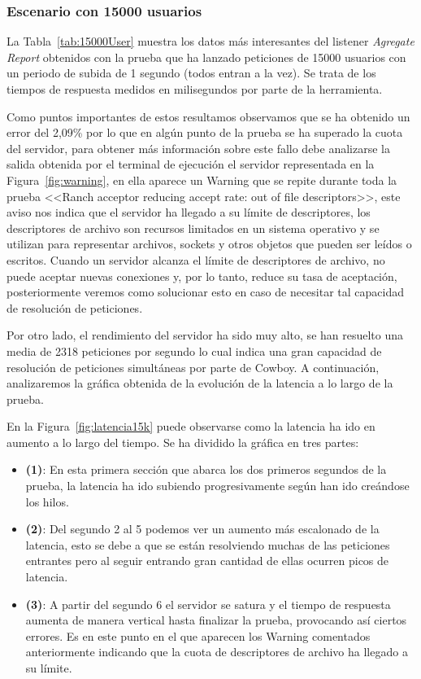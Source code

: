 \subsubsection{Escenario con 15000 usuarios}

La Tabla~\ref{tab:15000User} muestra los datos más interesantes del listener \textit{Agregate Report} obtenidos con la prueba que ha lanzado peticiones de 15000 usuarios con un periodo de subida de 1 segundo (todos entran a la vez). Se trata de los tiempos de respuesta medidos en milisegundos por parte de la herramienta.

Como puntos importantes de estos resultamos observamos que se ha obtenido un error del 2,09\% por lo que en algún punto de la prueba se ha superado la cuota del servidor, para obtener más información sobre este fallo debe analizarse la salida obtenida por el terminal de ejecución el servidor representada en la Figura~\ref{fig:warning}, en ella aparece un Warning que se repite durante toda la prueba <<Ranch acceptor reducing accept rate: out of file descriptors>>, este aviso nos indica que el servidor ha llegado a su límite de descriptores, los descriptores de archivo son recursos limitados en un sistema operativo y se utilizan para representar archivos, sockets y otros objetos que pueden ser leídos o escritos. Cuando un servidor alcanza el límite de descriptores de archivo, no puede aceptar nuevas conexiones y, por lo tanto, reduce su tasa de aceptación, posteriormente veremos como solucionar esto en caso de necesitar tal capacidad de resolución de peticiones.

Por otro lado, el rendimiento del servidor ha sido muy alto, se han resuelto una media de 2318 peticiones por segundo lo cual indica una gran capacidad de resolución de peticiones simultáneas por parte de Cowboy. A continuación, analizaremos la gráfica obtenida de la evolución de la latencia a lo largo de la prueba.

En la Figura~\ref{fig:latencia15k} puede observarse como la latencia ha ido en aumento a lo largo del tiempo. Se ha dividido la gráfica en tres partes: 
\begin{itemize}
    \item \textbf{(1)}: En esta primera sección que abarca los dos primeros segundos de la prueba, la latencia ha ido subiendo progresivamente según han ido creándose los hilos.
    \item \textbf{(2)}: Del segundo 2 al 5 podemos ver un aumento más escalonado de la latencia, esto se debe a que se están resolviendo muchas de las peticiones entrantes pero al seguir entrando gran cantidad de ellas ocurren picos de latencia.
    \item \textbf{(3)}: A partir del segundo 6 el servidor se satura y el tiempo de respuesta aumenta de manera vertical hasta finalizar la prueba, provocando así ciertos errores. Es en este punto en el que aparecen los Warning comentados anteriormente indicando que la cuota de descriptores de archivo ha llegado a su límite.
\end{itemize}




